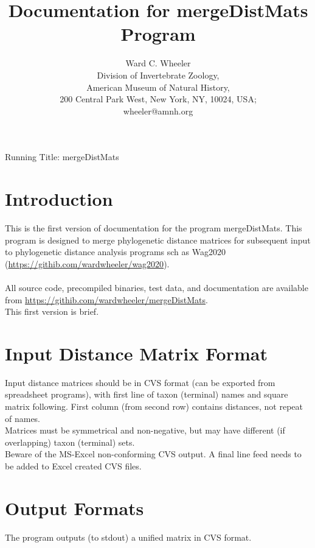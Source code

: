 \documentclass[11pt]{memoir}
\begin{document}
	
	\title{Documentation for mergeDistMats Program}
	\author{Ward C. Wheeler\\
		Division of Invertebrate Zoology,\\ American Museum of Natural History,\\ 200 Central Park West, New York, NY, 10024, USA;\\wheeler@amnh.org}
	
	
	\maketitle
	\begin{center}
		Running Title: mergeDistMats
	\end{center}
	\newpage
	
	
	\section{Introduction}
	This is the first version of documentation for the program mergeDistMats.  This program is designed to 
	merge phylogenetic distance matrices for subsequent input to phylogenetic distance analysis programs sch as 
	Wag2020 (\url{https://githib.com/wardwheeler/wag2020}).\\ \\
	All source code, precompiled binaries, test data, and documentation are available from \url{https://githib.com/wardwheeler/mergeDistMats}.\\
	
	\noindent This first version is brief.
	
	\section{Input Distance Matrix Format}
	Input distance matrices should be in CVS format (can be exported from spreadsheet programs),  with first line of
	taxon (terminal) names and square matrix following.  First column (from second row) contains distances, not repeat of names.\\
	
	\noindent Matrices must be symmetrical and non-negative, but may have different (if overlapping) taxon (terminal) sets.\\
	
	\noindent Beware of the MS-Excel
	non-conforming CVS output.  A final line feed needs to be added to Excel created CVS files.
	
	
	\section{Output Formats}
	The program outputs (to stdout) a unified matrix in CVS format.
	
\end{document}
